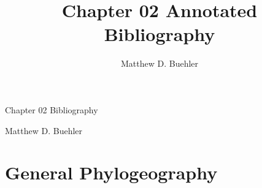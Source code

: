 \documentclass[12pt]{report}
\title{Chapter 02 Annotated Bibliography}
\author{Matthew D. Buehler}
\date{}
\begin{document}
\begin{center}
    \Large{Chapter 02 Bibliography}\\
\end{center}
\begin{center}
    Matthew D. Buehler
\end{center}
\section*{General Phylogeography}
\\
\\

\printbibliography[title=Chapter 03 Annotated Bibliography]
\end{document}
